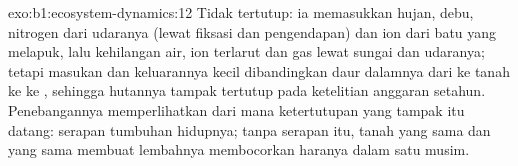 \begin{solution}{exo:b1:ecosystem-dynamics:12}
Tidak tertutup: ia memasukkan hujan, debu, nitrogen dari udaranya
(lewat fiksasi dan pengendapan) dan ion dari batu yang melapuk, lalu
kehilangan air, ion terlarut dan gas lewat sungai dan udaranya; tetapi
masukan dan keluarannya kecil dibandingkan daur dalamnya dari 
ke tanah ke  ke , sehingga hutannya tampak tertutup pada
ketelitian anggaran setahun. Penebangannya memperlihatkan dari mana
ketertutupan yang tampak itu datang: serapan tumbuhan hidupnya; tanpa
serapan itu, tanah yang sama dan  yang sama membuat lembahnya
membocorkan haranya dalam satu musim.
\end{solution}

